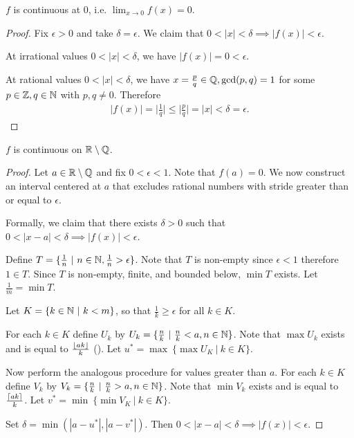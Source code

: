 \documentclass[12pt]{article}
\begin{document}
\begin{claim*}
  $f$ is continuous at $0$, i.e. $\lim_{x \to 0}f(x) = 0$.
\end{claim*}

\begin{proof}
  Fix $\epsilon > 0$ and take $\delta = \epsilon$. We claim that
  $0 < |x| < \delta \implies |f(x)| < \epsilon$.

  At irrational values $0 < |x| < \delta$, we have $|f(x)| = 0 < \epsilon$.

  At rational values $0 < |x| < \delta$, we have $x = \frac{p}{q} \in \mathbb{Q}, \gcd(p, q) = 1$ for some
  $p \in \mathbb{Z}, q \in \mathbb{N}$ with $p, q \neq 0$. Therefore
  \begin{align*}
    |f(x)| = \Big|\frac{1}{q}\Big| \leq \Big|\frac{p}{q}\Big| = |x| < \delta = \epsilon.
  \end{align*}
\end{proof}

\begin{claim*}
  $f$ is continuous on $\mathbb{R}\setminus\mathbb{Q}$.
\end{claim*}

\begin{proof}
  Let $a \in \mathbb{R}\setminus\mathbb{Q}$ and fix $0 < \epsilon < 1$. Note that $f(a) = 0$. We now construct an
  interval centered at $a$ that excludes rational numbers with stride greater than or equal to
  $\epsilon$.

  Formally, we claim that there exists $\delta > 0$ such that
  $0 < |x - a| < \delta \implies |f(x)| < \epsilon$.

  Define $T = \{\frac{1}{n} ~|~ n \in \mathbb{N}, \frac{1}{n} > \epsilon\}$. Note that $T$ is non-empty
  since $\epsilon < 1$ therefore $1 \in T$. Since $T$ is non-empty, finite, and bounded below,
  $\min T$ exists. Let $\frac{1}{m} = \min T$.

  Let $K = \{k \in \mathbb{N} ~|~ k < m\}$, so that $\frac{1}{k} \geq \epsilon$ for all $k \in K$.

  For each $k \in K$ define $U_k$ by $U_k = \{\frac{n}{k} ~|~ \frac{n}{k} < a, n \in \mathbb{N}\}$. Note
  that $\max U_k$ exists and is equal to $\frac{\lfloor ak\rfloor}{k}$ (). Let
  $u^* = \max ~ \{\max U_K ~|~ k \in K\}$.

  Now perform the analogous procedure for values greater than $a$. For each $k \in K$ define $V_k$
  by $V_k = \{\frac{n}{k} ~|~ \frac{n}{k} > a, n \in \mathbb{N}\}$. Note that $\min V_k$ exists and is
  equal to $\frac{\lceil ak\rceil}{k}$. Let $v^* = \min ~ \{\min V_K ~|~ k \in K\}$.

  Set $\delta = \min(|a - u^*|, |a - v^*|)$. Then
  $0 < |x - a| < \delta \implies |f(x)| < \epsilon$.
\end{proof}
\end{document}
